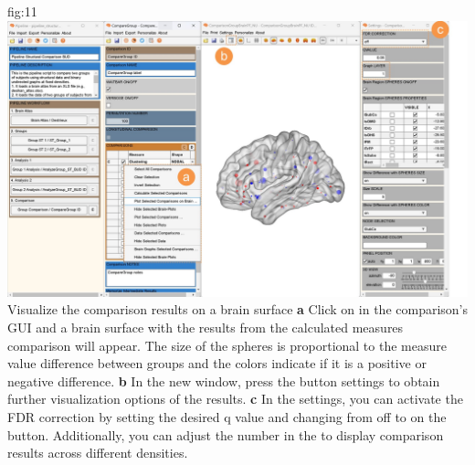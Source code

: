 \documentclass[justified]{tufte-handout}
\begin{document}
	{fig:11}
	{
	\includegraphics{fig11.jpg}
	}
    {Visualize the comparison results on a brain surface}
    {
        {\bf a} Click on  in the comparison's GUI and a brain surface with the results from the calculated measures comparison will appear. The size of the spheres is proportional to the measure value difference between groups and the colors indicate if it is a positive or negative difference.   
        {\bf b} In the new window, press the button settings to obtain further visualization options of the results. 
        {\bf c} In the settings, you can activate the FDR correction by setting the desired q value and changing from off to on the button. Additionally, you can adjust the number in the  to display comparison results across different densities.
    }
\end{document}
